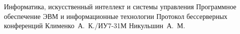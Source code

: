 \documentclass{bmstu}
\begin{document}
\makecourseworktitle
    {Информатика, искусственный интеллект и системы управления} %
    {Программное обеспечение ЭВМ и информационные технологии} %
    {Протокол бессерверных конференций} %
    {Клименко~А.~К./ИУ7-31М} %
    {Никульшин~А.~М.} %
    {} %

\setcounter{page}{3}

{\fontsize{12pt}{1em}
\selectfont
\maketableofcontents

%
%








}

\makebibliography


\end{document}
